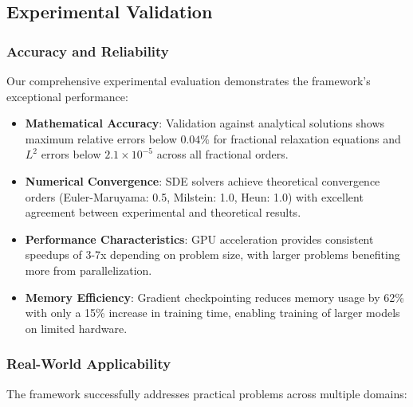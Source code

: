 \subsection{Experimental Validation}

\subsubsection{Accuracy and Reliability}

Our comprehensive experimental evaluation demonstrates the framework's exceptional performance:

\begin{itemize}
    \item \textbf{Mathematical Accuracy}: Validation against analytical solutions shows maximum relative errors below $0.04\%$ for fractional relaxation equations and $L^2$ errors below $2.1 \times 10^{-5}$ across all fractional orders.
    
    \item \textbf{Numerical Convergence}: SDE solvers achieve theoretical convergence orders (Euler-Maruyama: 0.5, Milstein: 1.0, Heun: 1.0) with excellent agreement between experimental and theoretical results.
    
    \item \textbf{Performance Characteristics}: GPU acceleration provides consistent speedups of 3-7x depending on problem size, with larger problems benefiting more from parallelization.
    
    \item \textbf{Memory Efficiency}: Gradient checkpointing reduces memory usage by 62\% with only a 15\% increase in training time, enabling training of larger models on limited hardware.
\end{itemize}

\subsubsection{Real-World Applicability}

The framework successfully addresses practical problems across multiple domains:

